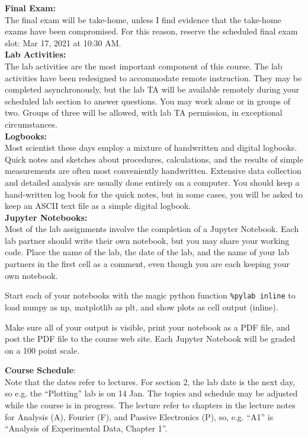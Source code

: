 \documentclass[12pt]{article}
\begin{document}
\noindent
\textbf{Final Exam:}\\
The final exam will be take-home, unless I find
evidence that the take-home exams have been compromised.  For this reason, reserve the scheduled final exam slot:  Mar 17, 2021 at 10:30 AM.\\

\noindent
\textbf {Lab Activities:}\\
The lab activities are the most important component of this course.
The lab activities have been redesigned to accommodate remote
instruction.  They may be completed asynchronously, but the lab TA
will be available remotely during your scheduled lab section to
answer questions.  You may work alone or in groups of two.  Groups of
three will be allowed, with lab TA permission, in exceptional
circumstances.\\

\noindent
\textbf {Logbooks:}\\ 
Most scientist these days employ a mixture of handwritten and digital
logbooks.  Quick notes and sketches about procedures, calculations,
and the results of simple measurements are often most conveniently
handwritten.  Extensive data collection and detailed analysis are
usually done entirely on a computer.  You should keep a hand-written
log book for the quick notes, but in some cases, you will be asked to
keep an ASCII text file as a simple digital logbook.\\

\noindent
\textbf {Jupyter Notebooks:}\\
Most of the lab assignments involve the completion of a Jupyter
Notebook.  Each lab partner should write their own notebook, but you
may share your working code.  Place the name of the lab, the date of
the lab, and the name of your lab partners in the first cell as a
comment, even though you are each keeping your own notebook.

Start each of your notebooks with the magic python function
{\tt\%pylab inline} to load numpy as np, matplotlib as plt, and show
plots as cell output (inline).

Make sure all of your output is visible, print your notebook as a PDF
file, and post the PDF file to the course web site. Each Jupyter
Notebook will be graded on a 100 point scale.\\

\newpage

\noindent
\textbf {Course Schedule}:\\
Note that the dates refer to lectures.  For section 2, the lab date is
the next day, so e.g. the ``Plotting'' lab is on 14 Jan.  The topics
and schedule may be adjusted while the course is in progress.  The
lecture refer to chapters in the lecture notes for Analysis (A), Fourier (F), and Passive Electronics (P), so, e.g. ``A1'' is ``Analysis of Experimental Data, Chapter 1''.
\end{document}
